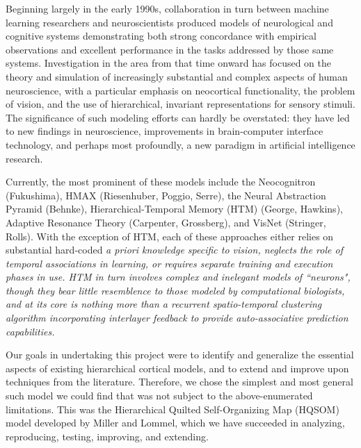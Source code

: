 \documentclass[a4paper,10pt]{article}
\begin{document}
Beginning largely in the early 1990s, collaboration in turn between machine learning researchers and
neuroscientists produced models of neurological and cognitive systems demonstrating both strong
concordance with empirical observations and excellent performance in the tasks addressed by those
same systems.\cite{Poggio} Investigation in the area from that time onward has focused on the theory
and simulation of increasingly substantial and complex aspects of human neuroscience, with a
particular emphasis on neocortical functionality, the problem of vision, and the use of
hierarchical, invariant representations for sensory stimuli.\cite{Poggio, HQSOM} The significance of
such modeling efforts can hardly be overstated: they have led to new findings in neuroscience,
improvements in brain-computer interface technology, and perhaps most profoundly, a new paradigm in
artificial intelligence research.\cite{HQSOM, OnIntelligence}

Currently, the most prominent of these models include the Neocognitron (Fukushima), HMAX
(Riesenhuber, Poggio, Serre), the Neural Abstraction Pyramid (Behnke), Hierarchical-Temporal Memory
(HTM) (George, Hawkins), Adaptive Resonance Theory (Carpenter, Grossberg), and VisNet (Stringer,
Rolls).\cite{HQSOM} With the exception of HTM, each of these approaches either relies on substantial
hard-coded \em a priori \em knowledge specific to vision, neglects the role of temporal associations
in learning, or requires separate training and execution phases in use.\cite{HQSOM, HTMAlgo} HTM in
turn involves complex and inelegant models of ``neurons", though they bear little resemblence to
those modeled by computational biologists, and at its core is nothing more than a recurrent
spatio-temporal clustering algorithm incorporating interlayer feedback to provide auto-associative
prediction capabilities.\cite{HTMAlgo}

Our goals in undertaking this project were to identify and generalize the essential aspects of
existing hierarchical cortical models, and to extend and improve upon techniques from the
literature. Therefore, we chose the simplest and most general such model we could find that was not
subject to the above-enumerated limitations. This was the Hierarchical Quilted Self-Organizing Map
(HQSOM) model developed by Miller and Lommel, which we have succeeded in analyzing, reproducing,
testing, improving, and extending. 
\end{document}
